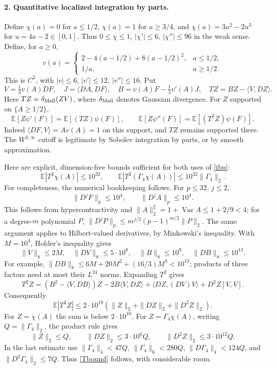 \documentclass[11pt]{article}
\newcommand{\E}{\mathbb E}\newcommand{\Pp}{\mathbb P}\newcommand{\Ga}{\Gamma}
\begin{document}
\paragraph{2. Quantitative localized integration by parts.}
Define $\chi(a)=0$ for $a\le1/2$, $\chi(a)=1$ for $a\ge3/4$, and
$\chi(a)=3u^2-2u^3$ for $u=4a-2\in[0,1]$. Thus
$0\le\chi\le1$, $|\chi'|\le6$, $|\chi''|\le96$ in the weak sense.
Define, for $a\ge0$,
\[
 v(a)=\begin{cases}2-4(a-1/2)+8(a-1/2)^2,&a\le1/2,\\1/a,&a\ge1/2.\end{cases}
\]
This is $C^2$, with $|v|\le6$, $|v'|\le12$, $|v''|\le16$.
Put
\[
 V=\tfrac13v(A)DF,\quad J=\langle DA,DF\rangle,\quad
 B=v(A)F-\tfrac13v'(A)J,\quad TZ=BZ-\langle V,DZ\rangle.
\]
Here $T Z=\delta_{\rm Mall}(ZV)$, where $\delta_{\rm Mall}$ denotes Gaussian divergence.
For $Z$ supported on $\{A\ge1/2\}$,
\begin{equation}\label{ibp}
 \E[Z\psi'(F)]=\E[(TZ)\psi(F)],\qquad
 \E[Z\psi''(F)]=\E[(T^2Z)\psi(F)].
\end{equation}
Indeed $\langle DF,V\rangle=Av(A)=1$ on this support, and $TZ$ remains supported there.
The $W^{2,\infty}$ cutoff is legitimate by Sobolev integration by parts, or by smooth approximation.

Here are explicit, dimension-free bounds sufficient for both uses of \eqref{ibp}:
\begin{equation}\label{Tbound}
 \E|T^2\chi(A)|\le10^{32},\qquad
 \E|T^2(\Ga_4\chi(A))|\le10^{32}\|\Ga_4\|_2.
\end{equation}
For completeness, the numerical bookkeeping follows. For $p\le32$, $j\le2$,
\[
 \|D^jF\|_p\le10^4,\qquad \|D^jA\|_p\le10^4.
\]
This follows from hypercontractivity and
$\|A\|_2^2=1+\operatorname{Var}A\le1+2/9<4$;
for a degree-$m$ polynomial $P$,
$\|D^jP\|_p\le m^{j/2}(p-1)^{m/2}\|P\|_2$.
The same argument applies to Hilbert-valued derivatives, by Minkowski's inequality.
With $M=10^4$, Holder's inequality gives
\[
 \|V\|_8\le2M,\quad \|DV\|_8\le5\cdot10^8,\quad
 \|B\|_8\le10^9,\quad \|DB\|_8\le10^{13}.
\]
For example,
$\|DB\|_8\le6M+20M^2+(16/3)M^3<10^{13}$;
products of three factors need at most their $L^{24}$ norms.
Expanding $T^2$ gives
\[
 T^2 Z=(B^2-\langle V,DB\rangle)Z-2B\langle V,DZ\rangle
 +\langle DZ,(DV)V\rangle+D^2Z[V,V].
\]
Consequently
\[
 \E|T^2Z|\le2\cdot10^{18}
 (\|Z\|_2+\|DZ\|_2+\|D^2Z\|_2).
\]
For $Z=\chi(A)$ the sum is below $2\cdot10^{10}$.
For $Z=\Ga_4\chi(A)$, writing $Q=\|\Ga_4\|_2$, the product rule gives
\[
 \|Z\|_2\le Q,\qquad \|DZ\|_2\le3\cdot10^6Q,\qquad
 \|D^2Z\|_2\le3\cdot10^{12}Q.
\]
In the last estimate use
$\|\Ga_4\|_4<47Q$, $\|\Ga_4\|_6<280Q$,
$\|D\Ga_4\|_4<124Q$, and $\|D^2\Ga_4\|_2\le7Q$.
Thus \eqref{Tbound} follows, with considerable room.
\end{document}
